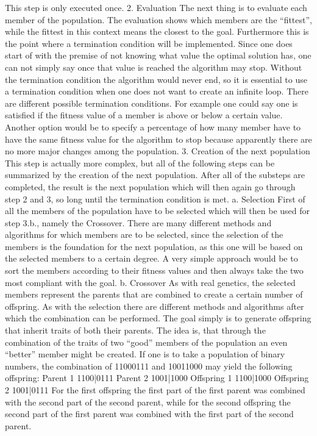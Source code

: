 \documentclass[11pt,a4paper]{article}
\begin{document}
This step is only executed once.
2.    Evaluation
The next thing is to evaluate each member of the population. The evaluation shows which members are the “fittest”, while the fittest in this context means the closest to the goal.
Furthermore this is the point where a termination condition will be implemented. Since one does start of with the premise of not knowing what value the optimal solution has, one can not simply say once that value is reached the algorithm may stop. Without the termination condition the algorithm would never end, so it is essential to use a termination condition when one does not want to create an infinite loop. There are different possible termination conditions. For example one could say one is satisfied if the fitness value of a member is above or below a certain value. Another option would be to specify a percentage of how many member have to have the same fitness value for the algorithm to stop because apparently there are no more major changes among the population.
3.    Creation of the next population
This step is actually more complex, but all of the following steps can be summarized by the creation of the next population. After all of the substeps are completed, the result is the next population which will then again go through step 2 and 3, so long until the termination condition is met.
a.    Selection
First of all the members of the population have to be selected which will then be used for step 3.b., namely the Crossover. There are many different methods and algorithms for which members are to be selected, since the selection of the members is the foundation for the next population, as this one will be based on the selected members to a certain degree.
A very simple approach would be to sort the members according to their fitness values and then always take the two most compliant with the goal.
b.    Crossover
As with real genetics, the selected members represent the parents that are combined to create a certain number of offspring. As with the selection there are different methods and algorithms after which the combination can be performed. The goal simply is to generate offspring that inherit traits of both their parents. The idea is, that through the combination of the traits of two “good” members of the population an even “better” member might be created. If one is to take a population of binary numbers, the combination of 11000111 and 10011000 may yield the following offspring: 
Parent 1    1100|0111
Parent 2    1001|1000
Offspring 1     1100|1000
Offspring 2    1001|0111
For the first offspring the first part of the first parent was combined with the second part of the second parent, while for the second offspring the second part of the first parent was combined with the first part of the second parent.
\end{document}
